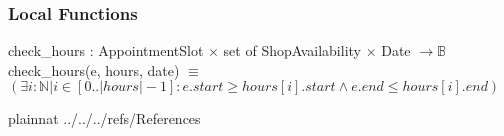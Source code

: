 \documentclass[12pt, titlepage]{article}
\begin{document}
\subsubsection{Local Functions}
check\_hours : AppointmentSlot $\times$ set of ShopAvailability $\times$ Date $\rightarrow \mathbb{B}$ \\
check\_hours(e, hours, date) $\equiv$ $(\exists i:\mathbb{N}| i \in [0..|hours|-1] : e.start \ge hours[i].start  \land e.end \le hours[i].end)$

\newpage

 {plainnat}
 {../../../refs/References}

\newpage


\end{document}
